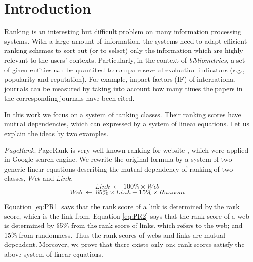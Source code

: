 \documentclass[10pt,leqno,twoside]{article}
\begin{document}
\section{Introduction}
Ranking is an interesting but difficult problem on many information processing systems. With a large amount of information, the systems need to adapt efficient ranking schemes to sort out (or to select) only the information which are highly relevant to the users' contexts.
Particularly, in the context of \emph{bibliometrics}, %
a set of given entities can be quantified to compare several evaluation indicators (e.g., popularity and reputation). For example, impact factors (IF) of international journals can be measured by taking into account how many times the papers in the corresponding journals have been cited.

In this work we focus on a system of ranking classes. Their ranking scores have mutual dependencies, which can expressed by a system of linear equations. Let us explain the ideas by two examples.

\textit{PageRank}. PageRank is very well-known ranking for website \cite{pagerank98}, which were applied in Google search engine. We rewrite the original formula by a system of two generic linear equations describing the mutual dependency of ranking of two classes, $Web$ and $Link$.
{\small
\begin{equation}\label{eq:PR1}
Link ~\longleftarrow~ 100\% \times Web
\end{equation}
\begin{equation}\label{eq:PR2}
Web ~\longleftarrow~ 85\% \times Link + 15\%\times Random
\end{equation}
}

Equation \ref{eq:PR1} says that the rank score of a link is determined by the rank score, which is the link from. Equation \ref{eq:PR2} says that the rank score of a web is determined  by 85\% from the rank score of links, which refers to the web; and 15\% from randomness. Thus the rank scores of webs and links are mutual dependent. Moreover, we prove that there exists only one rank scores satisfy the above system of linear equations.
\end{document}
